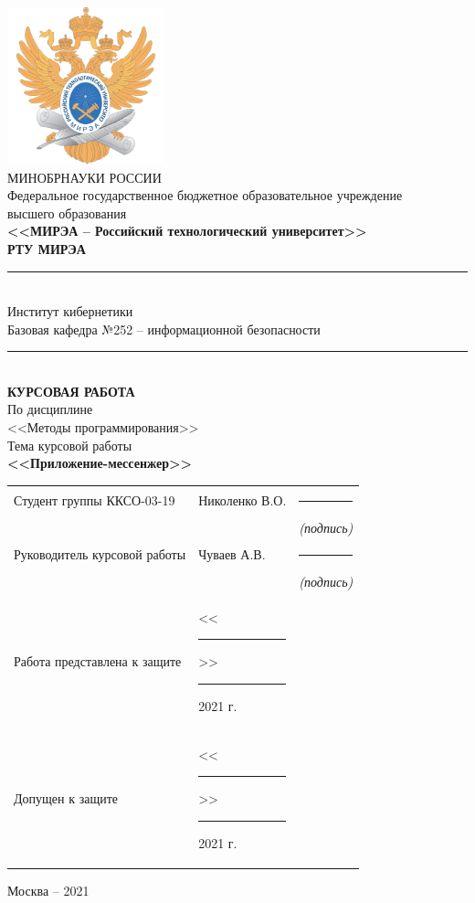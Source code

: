 \documentclass[utf8,14pt,a4paper,oneside,russian]{book}
\begin{document}
	
	\thispagestyle{empty}
	\small
	\begin{center}
		\includegraphics[width=4.55cm]{logo_mirea}\\
		\MakeUppercase{Минобрнауки России}\\[1em]
		Федеральное государственное бюджетное образовательное учреждение\\
		высшего образования\\[0.5em]
		\textbf{<<МИРЭА -- Российский технологический университет>>}\\
		\textbf{РТУ МИРЭА}\\
		\rule{\textwidth}{0.75pt}\\
		Институт кибернетики\\
		Базовая кафедра №252 -- информационной безопасности\\[-0.45em]
		\rule{\textwidth}{0.75pt}\\[5em]
		\normalsize\MakeUppercase{\textbf{Курсовая работа}}\small\\[0.5em]
		По дисциплине\\ <<Методы программирования>>\\[1.5em]
		Тема курсовой работы\\ \textbf{<<Приложение-мессенжер>>} \\[3em]
		\begin{tabular}{p{7cm}p{6cm}c}
			Студент группы ККСО-03-19 & Николенко В.О. & \rule{2cm}{0.75pt}\\[-0.5em]
			& & \footnotesize\textit{(подпись)}\small\\[1em]
			Руководитель курсовой работы & Чуваев А.В. & \rule{2cm}{0.75pt}\\[-0.5em]
			& & \footnotesize\textit{(подпись)}\small\\[5em]
			Работа представлена к защите & <<\rule{0.5cm}{0.75pt}>> \rule{2cm}{0.75pt} 2021 г. & \\[1em]
			Допущен к защите & <<\rule{0.5cm}{0.75pt}>> \rule{2cm}{0.75pt} 2021 г. & \\[1em]
		\end{tabular}
		\vfill
		Москва -- 2021
	\end{center}
	\normalsize
	\newpage
	
\end{document}
